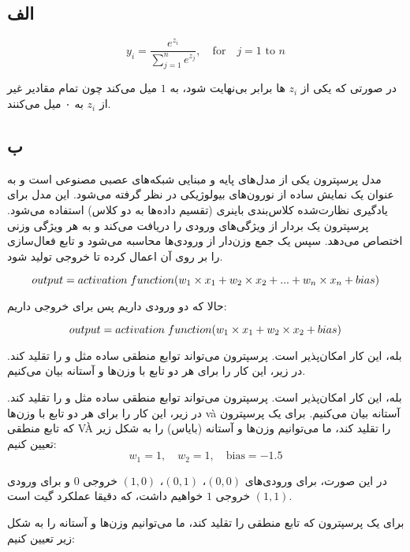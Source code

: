 \subsection*{الف}

$$
y_i = \frac{e^{z_i}}{\sum_{j=1}^{n} e^{z_j}}, \quad \text{for} \quad j = 1 \text{ to } n
$$

در صورتی که یکی از
$z_i$
ها برابر بی‌نهایت شود، 
به 
$1$
میل می‌کند چون تمام مقادیر غیر از 
$z_i$
به ۰ میل می‌کنند.

\subsection*{ب}

مدل پرسپترون یکی از مدل‌های پایه و مبنایی شبکه‌های عصبی مصنوعی است و به عنوان یک نمایش ساده از نورون‌های بیولوژیکی در نظر گرفته می‌شود. این مدل برای یادگیری نظارت‌شده کلاس‌بندی باینری (تقسیم داده‌ها به دو کلاس) استفاده می‌شود. پرسپترون یک بردار از ویژگی‌های ورودی را دریافت می‌کند و به هر ویژگی وزنی اختصاص می‌دهد. سپس یک جمع وزن‌دار از ورودی‌ها محاسبه می‌شود و تابع فعال‌سازی را بر روی آن اعمال کرده تا خروجی تولید شود.

$$
output = activation \hspace{1mm} function (w_1 \times x_1 + w_2 \times x_2 + ... + w_n \times x_n + bias)
$$

حالا که دو ورودی داریم پس برای خروجی داریم:

$$
output = activation \hspace{1mm} function (w_1 \times x_1 + w_2 \times x_2 + bias)
$$


بله، این کار امکان‌پذیر است. پرسپترون می‌تواند توابع منطقی ساده مثل
و
را تقلید کند. در زیر، این کار را برای هر دو تابع با وزن‌ها و آستانه بیان می‌کنیم.


بله، این کار امکان‌پذیر است. پرسپترون می‌تواند توابع منطقی ساده مثل
و
را تقلید کند. در زیر، این کار را برای هر دو تابع با وزن‌ها và آستانه بیان می‌کنیم.
برای یک پرسپترون که تابع منطقی VÀ را تقلید کند، ما می‌توانیم وزن‌ها و آستانه (بایاس) را به شکل زیر تعیین کنیم:
$$
w_1 = 1, \quad w_2 = 1, \quad \text{bias} = -1.5
$$

در این صورت، برای ورودی‌های 
$(0, 0)$، $(0, 1)$، $(1, 0)$ 
خروجی 
$0$ 
و برای ورودی 
$(1, 1)$ 
خروجی 
$1$ 
خواهیم داشت، که دقیقا عملکرد گیت
است.


برای یک پرسپترون که تابع منطقی
را تقلید کند، ما می‌توانیم وزن‌ها و آستانه را به شکل زیر تعیین کنیم:

